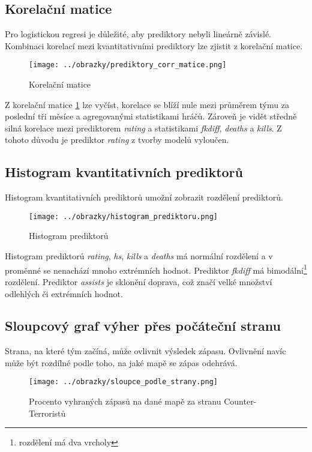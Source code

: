 \newpage
\subsection{Korelační matice}
Pro logistickou regresi je důležité, aby prediktory nebyli lineárně závislé. Kombinaci korelací mezi kvantitativními prediktory lze zjistit z korelační matice.

\begin{figure}[H]
    \centering
    \texttt{[image: ../obrazky/prediktory\_corr\_matice.png]}
    \caption{Korelační matice} 
    \label{fig:korelacni_matice}
\end{figure}

Z korelační matice \ref{fig:korelacni_matice} lze vyčíst, korelace se blíží nule mezi průměrem týmu za poslední tři měsíce a agregovanými statistikami hráčů. Zároveň je
vidět středně silná korelace mezi prediktorem \textit{rating} a statistikami \textit{fkdiff}, \textit{deaths} a \textit{kills}. Z tohoto důvodu je
prediktor \textit{rating} z tvorby modelů vyloučen.

\newpage
\subsection{Histogram kvantitativních prediktorů}
Histogram kvantitativních prediktorů umožní zobrazit rozdělení prediktorů.

\begin{figure}[H]
    \centering
    \texttt{[image: ../obrazky/histogram\_prediktoru.png]}
    \caption{Histogram prediktorů} 
    \label{fig:histogram_prediktoru}
\end{figure}

Histogram prediktorů \textit{rating}, \textit{hs}, \textit{kills} a \textit{deaths} má normální rozdělení a v proměnné se nenachází mnoho extrémních hodnot.
Prediktor \textit{fkdiff} má bimodální\footnote{rozdělení má dva vrcholy} rozdělení. Prediktor \textit{assists} je sklonění doprava, což značí velké množství 
odlehlých či extrémních hodnot.

\newpage
\subsection{Sloupcový graf výher přes počáteční stranu}
Strana, na které tým začíná, může ovlivnit výsledek zápasu. Ovlivnění navíc může být rozdílné podle toho, na jaké mapě se zápas odehrává.

\begin{figure}[H]
    \centering
    \texttt{[image: ../obrazky/sloupce\_podle\_strany.png]}
    \caption{Procento vyhraných zápasů na dané mapě za stranu Counter-Terroristů} 
    \label{fig:sloupcovy_graf_strany}
\end{figure}

